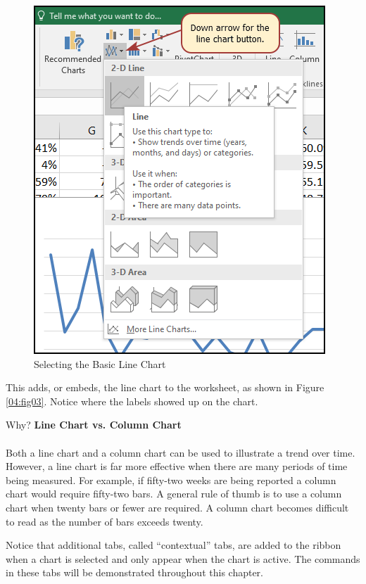 \begin{figure}[H]
	\centering
	\includegraphics[width=\maxwidth{.85\linewidth}]{gfx/ch04_fig02}
	\caption{Selecting the Basic Line Chart}
	\label{04:fig02}
\end{figure}

This adds, or embeds, the line chart to the worksheet, as shown in Figure \ref{04:fig03}. Notice where the labels showed up on the chart.

\begin{center}
	\begin{infobox}{Why?}
		\textbf{Line Chart vs. Column Chart}
		\\
		\\
		Both a line chart and a column chart can be used to illustrate a trend over time. However, a line chart is far more effective when there are many periods of time being measured. For example, if fifty-two weeks are being reported a column chart would require fifty-two bars. A general rule of thumb is to use a column chart when twenty bars or fewer are required. A column chart becomes difficult to read as the number of bars exceeds twenty.
	\end{infobox}
\end{center}

Notice that additional tabs, called ``contextual'' tabs, are added to the ribbon when a chart is selected and only appear when the chart is active. The commands in these tabs will be demonstrated throughout this chapter.


